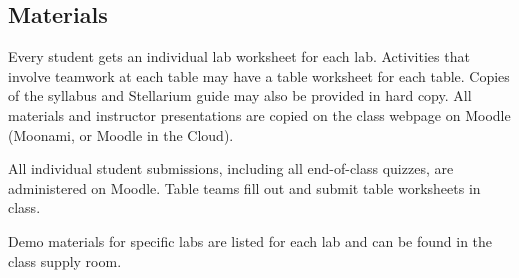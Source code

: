 \documentclass[12pt]{article}
\begin{document}
\subsection{Materials}
Every student gets an individual lab worksheet for each lab. Activities that involve teamwork at each table may have a table worksheet for each table. Copies of the syllabus and Stellarium guide may also be provided in hard copy. All materials and instructor presentations are copied on the class webpage on Moodle (Moonami, or Moodle in the Cloud).

All individual student submissions, including all end-of-class quizzes, are administered on Moodle. Table teams fill out and submit table worksheets in class.

Demo materials for specific labs are listed for each lab and can be found in the class supply room.
\end{document}

